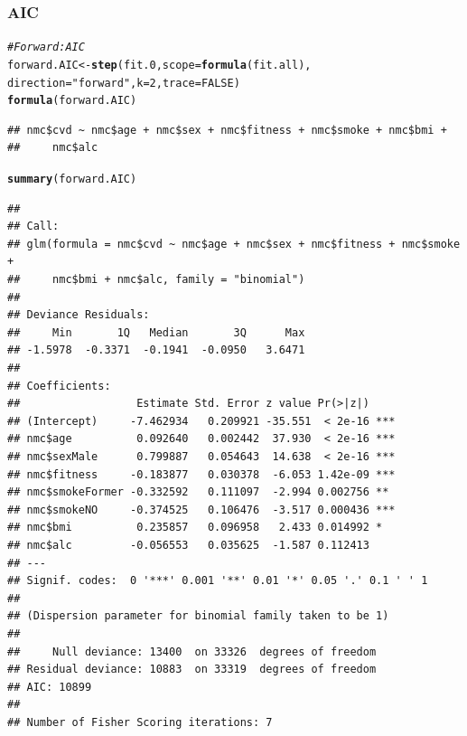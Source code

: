 \documentclass{article}\usepackage[]{graphicx}\usepackage[]{xcolor}
\makeatletter
\newcommand{\hlnum}[1]{\textcolor[rgb]{0.686,0.059,0.569}{#1}}%
\newcommand{\hlstr}[1]{\textcolor[rgb]{0.192,0.494,0.8}{#1}}%
\newcommand{\hlcom}[1]{\textcolor[rgb]{0.678,0.584,0.686}{\textit{#1}}}%
\newcommand{\hlstd}[1]{\textcolor[rgb]{0.345,0.345,0.345}{#1}}%
\newcommand{\hlkwb}[1]{\textcolor[rgb]{0.69,0.353,0.396}{#1}}%
\newcommand{\hlkwc}[1]{\textcolor[rgb]{0.333,0.667,0.333}{#1}}%
\newcommand{\hlkwd}[1]{\textcolor[rgb]{0.737,0.353,0.396}{\textbf{#1}}}%
\newenvironment{kframe}{%
 \def\at@end@of@kframe{}%
 \ifinner\ifhmode%
  \def\at@end@of@kframe{\end{minipage}}%
  \begin{minipage}{\columnwidth}%
 \fi\fi%
 \def\FrameCommand##1{\hskip\@totalleftmargin \hskip-\fboxsep
 \colorbox{shadecolor}{##1}\hskip-\fboxsep
     \hskip-\linewidth \hskip-\@totalleftmargin \hskip\columnwidth}%
 \MakeFramed {\advance\hsize-\width
   \@totalleftmargin\z@ \linewidth\hsize
   \@setminipage}}%
 {\par\unskip\endMakeFramed%
 \at@end@of@kframe}
\newenvironment{knitrout}{}{} %
\makeatother
\begin{document}
        \subsubsection{AIC}
\begin{knitrout}
\color{fgcolor}\begin{kframe}
\begin{alltt}
\hlcom{#Forward: AIC}
\hlstd{forward.AIC} \hlkwb{<-} \hlkwd{step}\hlstd{(fit.0,} \hlkwc{scope}\hlstd{=}\hlkwd{formula}\hlstd{(fit.all),}
                   \hlkwc{direction}\hlstd{=}\hlstr{"forward"}\hlstd{,} \hlkwc{k}\hlstd{=}\hlnum{2}\hlstd{,} \hlkwc{trace}\hlstd{=}\hlnum{FALSE}\hlstd{)}
\hlkwd{formula}\hlstd{(forward.AIC)}
\end{alltt}
\begin{verbatim}
## nmc$cvd ~ nmc$age + nmc$sex + nmc$fitness + nmc$smoke + nmc$bmi + 
##     nmc$alc
\end{verbatim}
\begin{alltt}
\hlkwd{summary}\hlstd{(forward.AIC)}
\end{alltt}
\begin{verbatim}
## 
## Call:
## glm(formula = nmc$cvd ~ nmc$age + nmc$sex + nmc$fitness + nmc$smoke + 
##     nmc$bmi + nmc$alc, family = "binomial")
## 
## Deviance Residuals: 
##     Min       1Q   Median       3Q      Max  
## -1.5978  -0.3371  -0.1941  -0.0950   3.6471  
## 
## Coefficients:
##                  Estimate Std. Error z value Pr(>|z|)    
## (Intercept)     -7.462934   0.209921 -35.551  < 2e-16 ***
## nmc$age          0.092640   0.002442  37.930  < 2e-16 ***
## nmc$sexMale      0.799887   0.054643  14.638  < 2e-16 ***
## nmc$fitness     -0.183877   0.030378  -6.053 1.42e-09 ***
## nmc$smokeFormer -0.332592   0.111097  -2.994 0.002756 ** 
## nmc$smokeNO     -0.374525   0.106476  -3.517 0.000436 ***
## nmc$bmi          0.235857   0.096958   2.433 0.014992 *  
## nmc$alc         -0.056553   0.035625  -1.587 0.112413    
## ---
## Signif. codes:  0 '***' 0.001 '**' 0.01 '*' 0.05 '.' 0.1 ' ' 1
## 
## (Dispersion parameter for binomial family taken to be 1)
## 
##     Null deviance: 13400  on 33326  degrees of freedom
## Residual deviance: 10883  on 33319  degrees of freedom
## AIC: 10899
## 
## Number of Fisher Scoring iterations: 7
\end{verbatim}
\end{kframe}
\end{knitrout}
          
\end{document}
